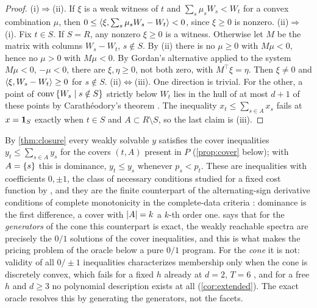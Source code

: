 \begin{proof}
(i)$\Rightarrow$(ii). If $\xi$ is a weak witness of $t$ and $\sum_s\mu_sW_s<W_t$ for a convex combination $\mu$, then $0\le\langle \xi, \sum_s\mu_sW_s-W_t\rangle<0$, since $\xi\ge0$ is nonzero. (ii)$\Rightarrow$(i). Fix $t\in S$. If $S=R$, any nonzero $\xi\ge0$ is a witness. Otherwise let $M$ be the matrix with columns $W_s-W_t$, $s\notin S$. By (ii) there is no $\mu\ge0$ with $M\mu<0$, hence no $\mu>0$ with $M\mu<0$. By Gordan's alternative \citep[Ch.~2, Thm.~2.4.5]{Mangasarian1969} applied to the system $M\mu<0$, $-\mu<0$, there are $\xi,\eta\ge0$, not both zero, with $M^\top\xi=\eta$. Then $\xi\ne0$ and $\langle \xi, W_s-W_t\rangle\ge0$ for $s\notin S$. (ii)$\Leftrightarrow$(iii). One direction is trivial. For the other, a point of $\operatorname{conv}\left\{ W_s\mid s\notin S \right\}$ strictly below $W_t$ lies in the hull of at most $d+1$ of these points by Carath\'eodory's theorem \citep[Thm.~17.1]{Rockafellar1970}. The inequality $x_t\le\sum_{s\in A}x_s$ fails at $x=\mathbf 1_{S}$ exactly when $t\in S$ and $A\subset R\setminus S$, so the last claim is (iii).
\end{proof}

\begin{remark}\label{rem:cover-bernstein}
By \cref{thm:closure} every weakly solvable $y$ satisfies the cover inequalities $y_t\le\sum_{s\in A}y_s$ for the covers $(t,A)$ present in $P$ (\cref{prop:cover} below); with $A=\left\{ s \right\}$ this is dominance, $y_t\le y_s$ whenever $p_s<p_t$. These are inequalities with coefficients $0,\pm1$, the class of necessary conditions studied for a fixed cost function by \citet[Prop.~5.2]{AgaltsovMolchanovShananin2018}, and they are the finite counterpart of the alternating-sign derivative conditions of complete monotonicity in the complete-data criteria \citep{HenkinShananin1990,Agaltsov2015}: dominance is the first difference, a cover with $\left\lvert A \right\rvert=k$ a $k$-th order one.  says that for the \emph{generators} of the cone this counterpart is exact, the weakly reachable spectra are precisely the $0/1$ solutions of the cover inequalities, and this is what makes the pricing problem of the oracle below a pure $0/1$ program. For the \emph{cone} it is not: validity of all $0/\pm1$ inequalities characterizes membership only when the cone is discretely convex, which fails for a fixed $h$ already at $d=2$, $T=6$ \citep{Molchanov2013a}, and for a free $h$ and $d\ge3$ no polynomial description exists at all (\cref{cor:extended}). The exact oracle resolves this by generating the generators, not the facets.
\end{remark}

